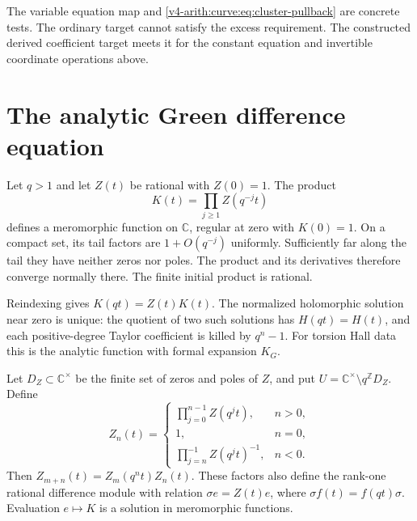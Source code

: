 The variable equation map and
\eqref{v4-arith:curve:eq:cluster-pullback} are concrete tests.
The ordinary target cannot satisfy the excess requirement.
The constructed derived coefficient target meets it for the
constant equation and invertible coordinate operations above.

\section{The analytic Green difference equation}
\label{v4-arith:curve:sec:analytic}

Let $q>1$ and let $Z(t)$ be rational with $Z(0)=1$. The product
\[
 K(t)=\prod_{j\geq1}Z(q^{-j}t)
\]
defines a meromorphic function on $\mathbb C$, regular at zero
with $K(0)=1$. On a compact set, its tail factors are
$1+O(q^{-j})$ uniformly. Sufficiently far along the tail
they have neither zeros nor poles. The product and its
derivatives therefore converge normally there. The finite
initial product is rational.

Reindexing gives $K(qt)=Z(t)K(t)$.
The normalized holomorphic solution near zero is unique:
the quotient of two such solutions has $H(qt)=H(t)$,
and each positive-degree Taylor coefficient is killed by
$q^n-1$. For torsion Hall data this is the analytic function
with formal expansion $K_G$.

Let $D_Z\subset\mathbb C^\times$ be the finite set of zeros
and poles of $Z$, and put
$U=\mathbb C^\times\setminus q^{\mathbb Z}D_Z$.
Define
\[
 Z_n(t)=
 \begin{cases}
  \prod_{j=0}^{n-1}Z(q^jt),&n>0,\\
  1,&n=0,\\
  \prod_{j=n}^{-1}Z(q^jt)^{-1},&n<0.
 \end{cases}
\]
Then $Z_{m+n}(t)=Z_m(q^nt)Z_n(t)$.
These factors also define the rank-one rational difference
module with relation $\sigma e=Z(t)e$, where
$\sigma f(t)=f(qt)\sigma$. Evaluation $e\mapsto K$ is a
solution in meromorphic functions.

